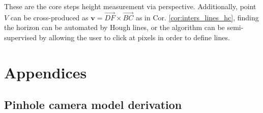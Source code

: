 \documentclass[a4paper]{article}
\begin{document}
These are the core steps height measurement via perspective. Additionally, point $V$ can be cross-produced as $\textbf{v}=\overrightarrow{DF}\times \overrightarrow{BC}$ as in Cor. \ref{cor:inters_lines_hc}, finding the horizon can be automated by Hough lines, or the algorithm can be semi-supervised by allowing the user to click at pixels in order to define lines.



\newpage
\printbibliography



\newpage
\appendix

\section{Appendices}

\newpage
\subsection{Pinhole camera model derivation}
\label{app:pinhole_model_deriv}
\end{document}
